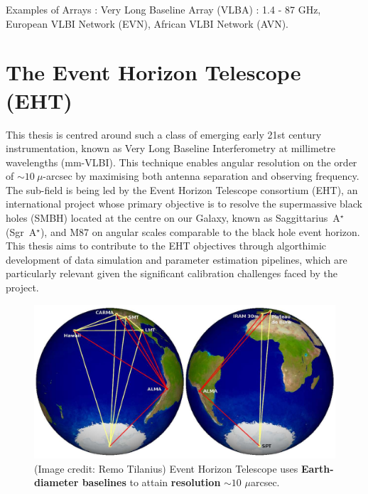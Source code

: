 
Examples of Arrays : Very Long Baseline Array (VLBA) : 1.4 - 87 GHz, European VLBI Network (EVN), African VLBI Network (AVN).  

\section{The Event Horizon Telescope (EHT)}
This thesis is centred around such a class of emerging early 21st century instrumentation, known as Very Long Baseline Interferometry at millimetre wavelengths (mm-VLBI). This technique enables angular resolution on the order of $\sim 10\ \mu$-arcsec by maximising both antenna separation and observing frequency. The sub-field is being led by the Event Horizon Telescope consortium (EHT), an international project whose primary objective is to resolve the supermassive black holes  (SMBH) located at the centre on our Galaxy, known as Saggittarius~A$^\star$ (Sgr~A$^\star$), and M87 on angular scales comparable to the black hole event horizon. This thesis aims to contribute to the EHT objectives through algorthimic development of data simulation and parameter estimation pipelines, which are particularly relevant given the significant calibration challenges faced by the project.

\begin{figure}
\begin{center}
\includegraphics[width=\columnwidth]{Images/eht_globe}
\caption{(Image credit: Remo Tilanius) Event Horizon Telescope uses \textbf{Earth-diameter baselines} to attain \textbf{resolution} \boldmath$\sim 10$ $\mu$arcsec. \label{fig:eht_globe}%
}
\end{center}
\end{figure}

